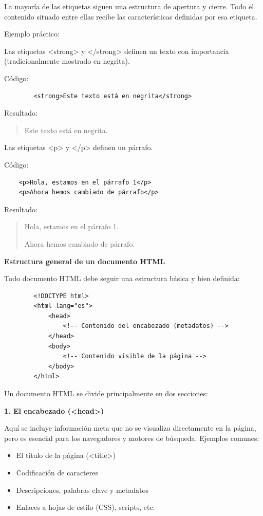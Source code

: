 \documentclass[11.5pt]{article}
\begin{document}
	La mayoría de las etiquetas siguen una estructura de apertura y cierre. Todo el contenido situado entre ellas recibe las características definidas por esa etiqueta.
	
	Ejemplo práctico:
	
	Las etiquetas <strong> y </strong> definen un texto con importancia (tradicionalmente mostrado en negrita).
	
	Código:
	\begin{verbatim}
		<strong>Este texto está en negrita</strong>
	\end{verbatim}
	
	Resultado:
	
	\begin{quotation}
		Este texto está en negrita.
	\end{quotation}
	
	Las etiquetas <p> y </p> definen un párrafo.
	
	Código:
	
	\begin{verbatim}
	<p>Hola, estamos en el párrafo 1</p>
	<p>Ahora hemos cambiado de párrafo</p>
	\end{verbatim}
	
	Resultado:
	
	\begin{quotation}
	Hola, estamos en el párrafo 1.
	
	Ahora hemos cambiado de párrafo.
	
	\end{quotation}
	
	\noindent\textbf{{\large Estructura general de un documento HTML}}
	
	Todo documento HTML debe seguir una estructura básica y bien definida:
	
	\begin{verbatim}
		<!DOCTYPE html>
		<html lang="es">
			<head>
				<!-- Contenido del encabezado (metadatos) -->
			</head>
			<body>
				<!-- Contenido visible de la página -->
			</body>
		</html>
	\end{verbatim}
	
	Un documento HTML se divide principalmente en dos secciones:
	
	\textbf{{\small 1. El encabezado (<head>)}}
	
	Aquí se incluye información meta que no se visualiza directamente en la página, pero es esencial para los navegadores y motores de búsqueda. Ejemplos comunes:
	
	\begin{itemize}
		\item El título de la página (<title>)
		\item 	Codificación de caracteres
		\item 	Descripciones, palabras clave y metadatos
		\item 	Enlaces a hojas de estilo (CSS), scripts, etc.
	\end{itemize}
	
\end{document}
